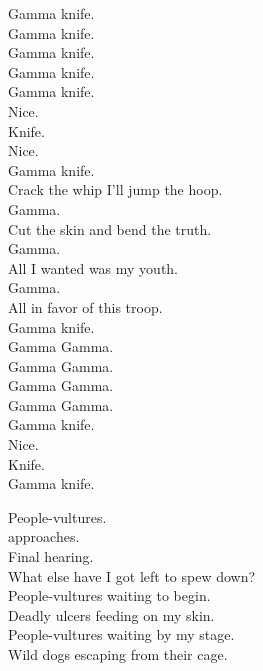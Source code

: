 Gamma knife. \\
Gamma knife. \\
Gamma knife. \\
Gamma knife. \\

Gamma knife. \\
Nice. \\
Knife. \\
Nice. \\
Gamma knife. \\

Crack the whip I'll jump the hoop. \\
Gamma. \\
Cut the skin and bend the truth. \\
Gamma. \\
All I wanted was my youth. \\
Gamma. \\
All in favor of this troop. \\
Gamma knife. \\

Gamma Gamma. \\
Gamma Gamma. \\
Gamma Gamma. \\
Gamma Gamma. \\

Gamma knife. \\

Nice. \\
Knife. \\
Gamma knife. \\




People-vultures. \\
 approaches. \\
Final hearing. \\
What else have I got left to spew down? \\

People-vultures waiting to begin. \\
Deadly ulcers feeding on my skin. \\

People-vultures waiting by my stage. \\
Wild dogs escaping from their cage. \\

